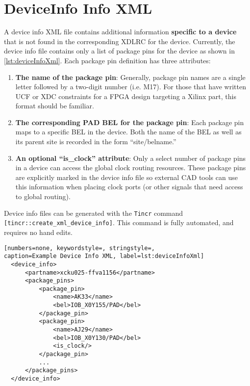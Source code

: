 \newpage
\section{DeviceInfo Info XML} \label{sec:deviceInfo}
A device info XML file contains additional information \textbf{specific to a
device} that is not found in the corresponding XDLRC for the device. Currently,
the device info file contains only a list of package pins for the device as
shown in \autoref{lst:deviceInfoXml}. Each package pin definition has three
attributes:

\begin{enumerate}
  \item \textbf{The name of the package pin}: Generally, package pin names are a
  single letter followed by a two-digit number (i.e. M17). For those that have
  written UCF or XDC constraints for a FPGA design targeting a Xilinx part, this
  format should be familiar.
  \item \textbf{The corresponding PAD BEL for the package pin}: Each
  package pin maps to a specific BEL in the device. Both the name of the
  BEL as well as its parent site is recorded in the form ``site/belname.''
  \item \textbf{An optional ``is\_clock'' attribute}: Only a select number of
  package pins in a device can access the global clock routing resources. These
  package pins are explicitly marked in the device info file so external CAD
  tools can use this information when placing clock ports (or other signals
  that need access to global routing).
\end{enumerate}

\noindent Device info files can be generated with the \texttt{Tincr}
command \texttt{[tincr::create\_xml\_device\-\_info]}. This command is fully
automated, and requires no hand edits.

\begin{lstlisting}[numbers=none, keywordstyle=, stringstyle=,
caption=Example Device Info XML, label=lst:deviceInfoXml]
  <device_info>
      <partname>xcku025-ffva1156</partname>
      <package_pins>
          <package_pin>
              <name>AK33</name>
              <bel>IOB_X0Y155/PAD</bel>
          </package_pin>
          <package_pin>
              <name>AJ29</name>
              <bel>IOB_X0Y130/PAD</bel>
              <is_clock/>
          </package_pin>
          ...
      </package_pins>
  </device_info>
\end{lstlisting}
